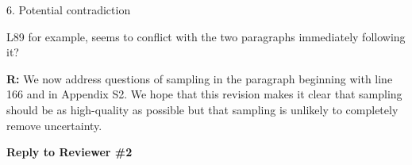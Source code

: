 \documentclass[12pt]{letter}
\newenvironment{refquote}{\bigskip \begin{it}}{\end{it}\smallskip}
\begin{document}
	6. Potential contradiction 
 

		\begin{refquote}
		L89 for example, seems to conflict with the two paragraphs immediately following it?
		\end{refquote}


		\textbf{R:} We now address questions of sampling in the paragraph beginning with line 166 and in Appendix S2. We hope that this revision makes it clear that sampling should be as high-quality as possible but that sampling is unlikely to completely remove uncertainty.




\clearpage


{\Large \bf Reply to Reviewer \#2} 
\end{document}
